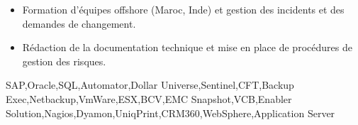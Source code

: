 \begin{experiences}
{\begin{itemize}
                        \item Formation d'équipes offshore (Maroc, Inde) et gestion des incidents et des demandes de changement.
                        \item Rédaction de la documentation technique et mise en place de procédures de gestion des risques.
                      \end{itemize}
                  }
                  {SAP,Oracle,SQL,Automator,Dollar Universe,Sentinel,CFT,Backup Exec,Netbackup,VmWare,ESX,BCV,EMC Snapshot,VCB,Enabler Solution,Nagios,Dyamon,UniqPrint,CRM360,WebSphere,Application Server}
\end{experiences}
